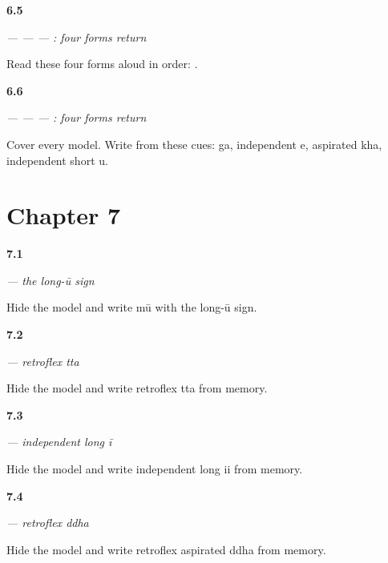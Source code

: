 \noindent\begin{minipage}[t]{\linewidth}
\raggedright
\hypertarget{review-GU-R06-first-four-r1-reading}{\textbf{6.5}} \emph{ —  —  — : four forms return}\par
\small Read these four forms aloud in order:    .
\end{minipage}\par\medskip

\noindent\begin{minipage}[t]{\linewidth}
\raggedright
\hypertarget{review-GU-R06-first-four-r1-dictation}{\textbf{6.6}} \emph{ —  —  — : four forms return}\par
\small Cover every model. Write from these cues: ga, independent e, aspirated kha, independent short u.
\end{minipage}\par\medskip

\section*{Chapter 7}

\noindent\begin{minipage}[t]{\linewidth}
\raggedright
\hypertarget{review-GU-W07-uu-matra-recall}{\textbf{7.1}} \emph{ — the long-ū sign}\par
\small Hide the model and write mū with the long-ū sign.
\end{minipage}\par\medskip

\noindent\begin{minipage}[t]{\linewidth}
\raggedright
\hypertarget{review-GU-W07-tta-recall}{\textbf{7.2}} \emph{ — retroflex tta}\par
\small Hide the model and write retroflex tta from memory.
\end{minipage}\par\medskip

\noindent\begin{minipage}[t]{\linewidth}
\raggedright
\hypertarget{review-GU-W07-independent-ii-recall}{\textbf{7.3}} \emph{ — independent long ī}\par
\small Hide the model and write independent long ii from memory.
\end{minipage}\par\medskip

\noindent\begin{minipage}[t]{\linewidth}
\raggedright
\hypertarget{review-GU-W07-ddha-recall}{\textbf{7.4}} \emph{ — retroflex ddha}\par
\small Hide the model and write retroflex aspirated ddha from memory.
\end{minipage}\par\medskip


